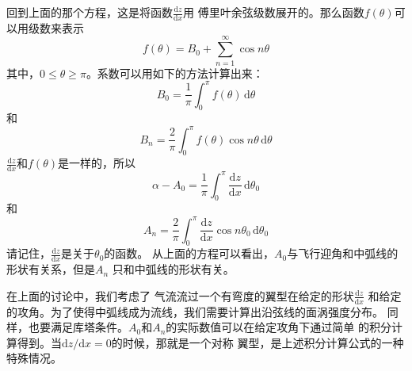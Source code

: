 回到上面的那个方程，这是将函数$\frac{\mathrm{d}z }{\mathrm{d}x}$用
傅里叶余弦级数展开的。那么函数$f(\theta)$可以用级数来表示
\[
  f(\theta)=B_0+\sum_{n=1}^\infty \cos n \theta
\]
其中，$0\leq \theta \geq \pi$。系数可以用如下的方法计算出来：
\[
  B_0=\frac{1}{\pi} \int _0^\pi f(\theta) \, \mathrm{d} \theta
\]
和
\[
  B_n=\frac{2}{\pi}\int _0 ^\pi f(\theta)\cos n \theta\, \mathrm{d} \theta
\]
$\frac{\mathrm{d} z }{\mathrm{d} x}$和$f(\theta)$是一样的，所以
\[
  \alpha-A_0=\frac{1}{\pi}\int _0^\pi \frac{\mathrm{d}z }{\mathrm{d}x }\, \mathrm{d} \theta_0
\]
和
\[
  A_n=\frac{2}{\pi}\int _0 ^\pi \frac{\mathrm{d} z }{\mathrm{d}x}\cos n \theta_0\,
  \mathrm{d} \theta_0
\]
请记住，$\frac{\mathrm{d}z }{\mathrm{d}x}$是关于$\theta_0$的函数。
从上面的方程可以看出，$A_0$与飞行迎角和中弧线的形状有关系，但是$A_n$
只和中弧线的形状有关。

在上面的讨论中，我们考虑了
气流流过一个有弯度的翼型在给定的形状$\frac{\mathrm{d}z }{\mathrm{d}x}$
和给定的攻角。为了使得中弧线成为流线，我们需要计算出沿弦线的面涡强度分布。
同样，也要满足库塔条件。$A_0$和$A_n$的实际数值可以在给定攻角下通过简单
的积分计算得到。当$\mathrm{d}z / \mathrm{d}x =0$的时候，那就是一个对称
翼型，是上述积分计算公式的一种特殊情况。

